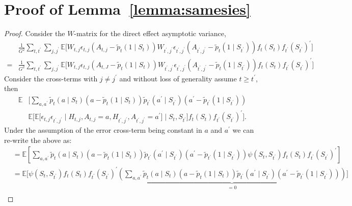 \documentclass[12pt]{article}
\begin{document}
\section{Proof of Lemma~\ref{lemma:samesies}}
\label{app:samesies}

\begin{proof}
Consider the $W$-matrix for the direct effect asymptotic variance,
\begin{align*}
 &\frac{1}{G^2} \sum_{t, t^\prime} \sum_{j, j^\prime} \mathbb{E} \bigg[
 W_{t,j} \epsilon_{t,j} (A_{t,j} - \tilde{p}_t( 1 \mid S_t))
 W_{t^\prime,j^\prime} \epsilon_{t^\prime,j^\prime} (A_{t^\prime,j^\prime} - \tilde{p}_t( 1 \mid S_{t^\prime}))
 f_t(S_t) f_{t^\prime}(S_{t^\prime})^\prime
                  \bigg] \\
=&\frac{1}{G^2} \sum_{t, t^\prime}\sum_{j, j^\prime} \mathbb{E} \bigg[
 W_{t,j} \epsilon_{t,j} (A_{t,J} - \tilde{p}_t( 1 \mid S_t))
 W_{t^\prime,j^\prime} \epsilon_{t^\prime,j^\prime} (A_{t^\prime,j^\prime} - \tilde{p}_t( 1 \mid S_{t^\prime}))
 f_t(S_t) f_{t^\prime}(S_{t^\prime})^\prime
                  \bigg]
\end{align*}
Consider the cross-terms with $j \neq j^\prime$ and without loss of generality assume $t \geq t^\prime$, then
\begin{align*}
\mathbb{E} &\bigg[ \sum_{a, a^\prime}  \tilde p_t (a \mid S_t) (a - \tilde{p}_t( 1 \mid S_t))
\tilde p_{t^\prime} (a^\prime \mid S_{t^\prime}) (a^\prime - \tilde p_{t^\prime} (1 \mid S_{t^\prime})) \\
&\mathbb{E} \bigg[ \mathbb{E} \bigg[ \epsilon_{t,j} \epsilon_{t^\prime,j^\prime} \mid H_{t,j}, A_{t,j} = a, H_{t^\prime,j^\prime}, A_{t^\prime,j^\prime} = a^\prime \bigg] \mid S_t, S_{t^\prime} \bigg] f_t(S_t) f_{t^\prime}(S_{t^\prime})^\prime
                  \bigg].
\end{align*}
Under the assumption of the error cross-term being constant in $a$ and $a^\prime$ we can re-write the above as:
\begin{align*}
&= \mathbb{E} \left[ \sum_{a, a^\prime}  \tilde p_t (a \mid S_t) (a - \tilde{p}_t( 1 \mid S_t))
\tilde p_{t^\prime} (a^\prime \mid S_{t^\prime}) (a^\prime - \tilde p_{t^\prime} (1 \mid S_{t^\prime})) \psi (S_t, S_{t^\prime}) f_t (S_t) f_{t^\prime} (S_{t^\prime})^\prime \right] \\
&= \mathbb{E} \bigg[ \psi (S_t, S_{t^\prime}) f_t (S_t) f_{t^\prime} (S_{t^\prime})^\prime \underbrace{\left( \sum_{a, a^\prime}  \tilde p_t (a \mid S_t) (a - \tilde{p}_t( 1 \mid S_t))
\tilde p_{t^\prime} (a^\prime \mid S_{t^\prime}) (a^\prime - \tilde p_{t^\prime} (1 \mid S_{t^\prime})) \right)}_{=0} \bigg] \\

\end{align*}
\end{proof}
\end{document}

